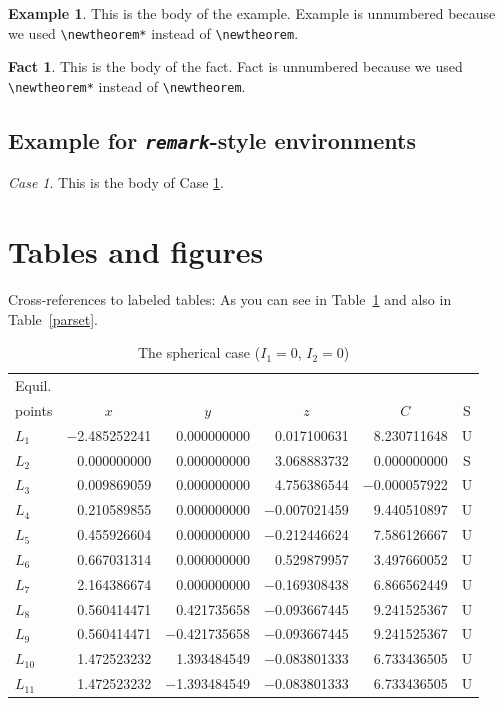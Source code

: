 \documentclass[ejsv2]{imsart}
\theoremstyle{plain}
\theoremstyle{definition}
\newtheorem*{example}{Example}
\newtheorem*{fact}{Fact}
\theoremstyle{remark}
\newtheorem{case}{Case}
\begin{document}
\begin{example}
This is the body of the example. Example is unnumbered because we used \verb|\newtheorem*|
instead of \verb|\newtheorem|.
\end{example}

\begin{fact}
This is the body of the fact. Fact is unnumbered because we used \verb|\newtheorem*|
instead of \verb|\newtheorem|.
\end{fact}


\subsection{Example for \emph{\texttt{remark}}-style environments}
\begin{case}\label{case}
This is the body of Case \ref{case}.
\end{case}


\section{Tables and figures}
Cross-references to labeled tables: As you can see in Table~\ref{sphericcase}
and also in Table~\ref{parset}.

\begin{table}[t]
\caption{The spherical case ($I_1=0$, $I_2=0$)}
\label{sphericcase}
\begin{tabular}{@{}lrrrrc@{}}
\hline
Equil. \\
points & \multicolumn{1}{c}{$x$}
& \multicolumn{1}{c}{$y$} & \multicolumn{1}{c}{$z$}
& \multicolumn{1}{c}{$C$} & S \\
\hline
$L_1$    & $-$2.485252241 & 0.000000000  & 0.017100631  & 8.230711648  & U \\
$L_2$    & 0.000000000  & 0.000000000  & 3.068883732  & 0.000000000  & S \\
$L_3$    & 0.009869059  & 0.000000000  & 4.756386544  & $-$0.000057922 & U \\
$L_4$    & 0.210589855  & 0.000000000  & $-$0.007021459 & 9.440510897  & U \\
$L_5$    & 0.455926604  & 0.000000000  & $-$0.212446624 & 7.586126667  & U \\
$L_6$    & 0.667031314  & 0.000000000  & 0.529879957  & 3.497660052  & U \\
$L_7$    & 2.164386674  & 0.000000000  & $-$0.169308438 & 6.866562449  & U \\
$L_8$    & 0.560414471  & 0.421735658  & $-$0.093667445 & 9.241525367  & U \\
$L_9$    & 0.560414471  & $-$0.421735658 & $-$0.093667445 & 9.241525367  & U \\
$L_{10}$ & 1.472523232  & 1.393484549  & $-$0.083801333 & 6.733436505  & U \\
$L_{11}$ & 1.472523232  & $-$1.393484549 & $-$0.083801333 & 6.733436505  & U \\
\hline
\end{tabular}
\end{table}
\end{document}
